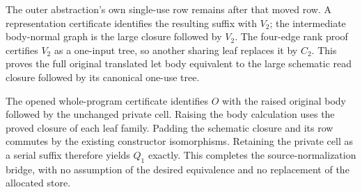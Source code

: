 The outer abstraction's own single-use row remains after that moved row.
A representation certificate identifies the resulting suffix with $V_2$;
the intermediate body-normal graph is the large closure followed by $V_2$.
The four-edge rank proof certifies $V_2$ as a one-input tree, so another
sharing leaf replaces it by $C_2$. This proves the full original translated
let body equivalent to the large schematic read closure followed by its
canonical one-use tree.

The opened whole-program certificate identifies $O$ with the raised original
body followed by the unchanged private cell. Raising the body calculation
uses the proved closure of each leaf family. Padding the schematic closure
and its row commutes by the existing constructor isomorphisms. Retaining
the private cell as a serial suffix therefore yields $Q_1$ exactly. This
completes the source-normalization bridge, with no assumption of the desired
equivalence and no replacement of the allocated store.
